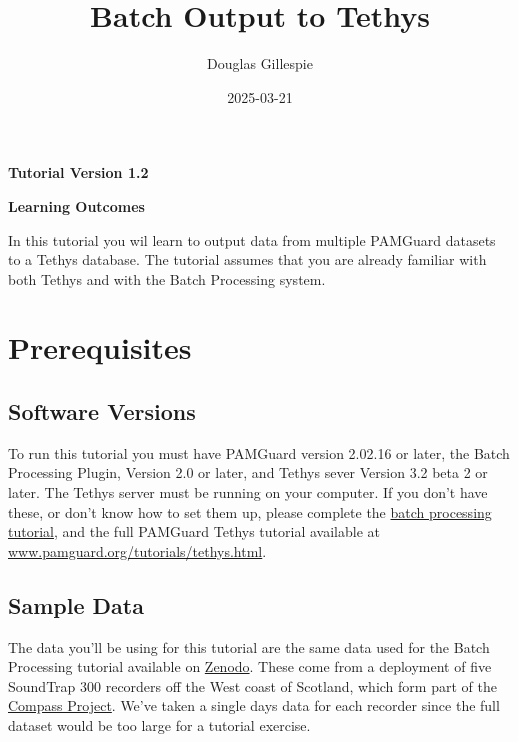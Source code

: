 \documentclass[
]{article}
\title{Batch Output to Tethys}
\author[1]{Douglas Gillespie}
\affil[1]{Sea Mammal Research Unit, University of St Andrews}
\date{2025-03-21}
\renewcommand*\contentsname{Table of contents}
\newcommand\contentsname{Table of contents}
\begin{document}
\maketitle

\centerline{\textbf{Tutorial Version 1.2}}
\vspace{3cm}


\centerline{\textbf{Learning Outcomes}}

In this tutorial you wil learn to output data from multiple PAMGuard datasets
to a Tethys database. The tutorial assumes that you are already familiar
with both Tethys and with the Batch Processing system.

\renewcommand*\contentsname{Table of contents}
{
\hypersetup{linkcolor=}
\setcounter{tocdepth}{3}
\tableofcontents
}

\newpage{}

\pagestyle{plain}

\section{Prerequisites}\label{prerequisites}

\subsection{Software Versions}\label{software-versions}

To run this tutorial you must have PAMGuard version 2.02.16 or later,
the Batch Processing Plugin, Version 2.0 or later, and Tethys sever
Version 3.2 beta 2 or later. The Tethys server must be running on your
computer. If you don't have these, or don't know how to set them up,
please complete the
\href{https://www.pamguard.org/tutorials/batchprocessing.html}{batch
processing tutorial}, and the full PAMGuard Tethys tutorial available at
\href{https://www.pamguard.org/tutorials/tethys.html}{www.pamguard.org/tutorials/tethys.html}.

\subsection{Sample Data}\label{sample-data}

The data you'll be using for this tutorial are the same data used for
the Batch Processing tutorial available on
\href{https://zenodo.org/records/14989668}{Zenodo}. These come from a
deployment of five SoundTrap 300 recorders off the West coast of
Scotland, which form part of the
\href{https://compass-oceanscience.eu/}{Compass Project}. We've taken a
single days data for each recorder since the full dataset would be too
large for a tutorial exercise.
\end{document}
